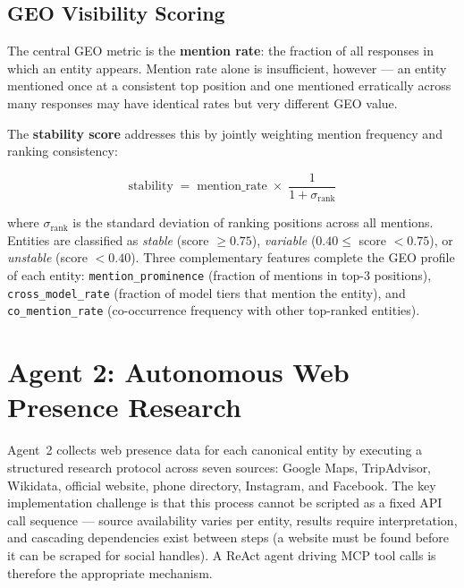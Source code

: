 \subsection{GEO Visibility Scoring}

The central GEO metric is the \textbf{mention rate}: the fraction of all responses
in which an entity appears. Mention rate alone is insufficient, however — an entity
mentioned once at a consistent top position and one mentioned erratically across
many responses may have identical rates but very different GEO value.

The \textbf{stability score} addresses this by jointly weighting mention frequency
and ranking consistency:

\begin{equation}
\text{stability} \;=\; \text{mention\_rate} \;\times\; \frac{1}{1 + \sigma_{\text{rank}}}
\label{eq:stability}
\end{equation}

where $\sigma_{\text{rank}}$ is the standard deviation of ranking positions across
all mentions. Entities are classified as \textit{stable} (score $\geq 0.75$),
\textit{variable} ($0.40 \leq$ score $< 0.75$), or \textit{unstable} (score $< 0.40$).
Three complementary features complete the GEO profile of each entity:
\texttt{mention\_prominence} (fraction of mentions in top-3 positions),
\texttt{cross\_model\_rate} (fraction of model tiers that mention the entity), and
\texttt{co\_mention\_rate} (co-occurrence frequency with other top-ranked entities).

\section{Agent 2: Autonomous Web Presence Research}
\label{sec:agent2impl}

Agent~2 collects web presence data for each canonical entity by executing a
structured research protocol across seven sources: Google Maps, TripAdvisor,
Wikidata, official website, phone directory, Instagram, and Facebook.
The key implementation challenge is that this process cannot be scripted as a
fixed API call sequence — source availability varies per entity, results require
interpretation, and cascading dependencies exist between steps (a website must be
found before it can be scraped for social handles). A ReAct agent driving MCP tool
calls is therefore the appropriate mechanism.

